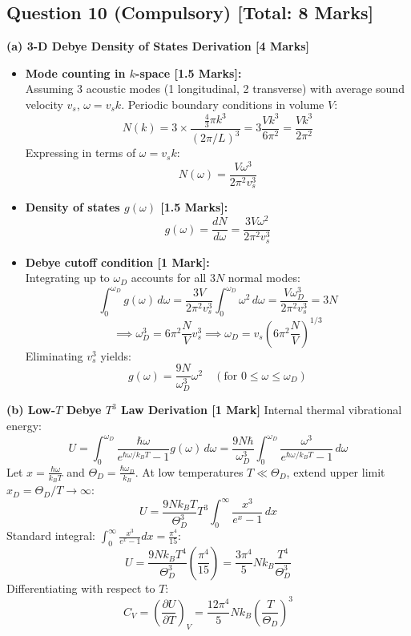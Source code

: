 \documentclass[10pt,a4paper,twocolumn]{article}
\begin{document}
\subsection*{Question 10 (Compulsory) [Total: 8 Marks]}
\textbf{(a) 3-D Debye Density of States Derivation [4 Marks]}
\begin{itemize}
    \item \textbf{Mode counting in $k$-space [1.5 Marks]:}\\
    Assuming 3 acoustic modes (1 longitudinal, 2 transverse) with average sound velocity $v_s$, $\omega = v_s k$. Periodic boundary conditions in volume $V$:
    $$N(k) = 3 \times \frac{\frac{4}{3}\pi k^3}{(2\pi/L)^3} = 3 \frac{V k^3}{6\pi^2} = \frac{V k^3}{2\pi^2}$$
    Expressing in terms of $\omega = v_s k$:
    $$N(\omega) = \frac{V \omega^3}{2\pi^2 v_s^3}$$
    \item \textbf{Density of states $g(\omega)$ [1.5 Marks]:}
    $$g(\omega) = \frac{dN}{d\omega} = \frac{3V \omega^2}{2\pi^2 v_s^3}$$
    \item \textbf{Debye cutoff condition [1 Mark]:}\\
    Integrating up to $\omega_D$ accounts for all $3N$ normal modes:
    $$\int_0^{\omega_D} g(\omega)\,d\omega = \frac{3V}{2\pi^2 v_s^3} \int_0^{\omega_D} \omega^2\,d\omega = \frac{V \omega_D^3}{2\pi^2 v_s^3} = 3N$$
    $$\implies \omega_D^3 = 6\pi^2 \frac{N}{V} v_s^3 \implies \omega_D = v_s \left(6\pi^2 \frac{N}{V}\right)^{1/3}$$
    Eliminating $v_s^3$ yields:
    $$g(\omega) = \frac{9N}{\omega_D^3}\omega^2 \quad (\text{for } 0 \le \omega \le \omega_D)$$
\end{itemize}

\textbf{(b) Low-$T$ Debye $T^3$ Law Derivation [1 Mark]}
Internal thermal vibrational energy:
$$U = \int_0^{\omega_D} \frac{\hbar\omega}{e^{\hbar\omega/k_B T} - 1} g(\omega)\,d\omega = \frac{9N\hbar}{\omega_D^3}\int_0^{\omega_D} \frac{\omega^3}{e^{\hbar\omega/k_B T} - 1}\,d\omega$$
Let $x = \frac{\hbar\omega}{k_B T}$ and $\Theta_D = \frac{\hbar\omega_D}{k_B}$. At low temperatures $T \ll \Theta_D$, extend upper limit $x_D = \Theta_D/T \to \infty$:
$$U = \frac{9N k_B T}{\Theta_D^3} T^3 \int_0^\infty \frac{x^3}{e^x - 1}\,dx$$
Standard integral: $\int_0^\infty \frac{x^3}{e^x - 1}dx = \frac{\pi^4}{15}$:
$$U = \frac{9Nk_B T^4}{\Theta_D^3} \left(\frac{\pi^4}{15}\right) = \frac{3\pi^4}{5} N k_B \frac{T^4}{\Theta_D^3}$$
Differentiating with respect to $T$:
$$C_V = \left(\frac{\partial U}{\partial T}\right)_V = \frac{12\pi^4}{5} N k_B \left(\frac{T}{\Theta_D}\right)^3$$
\end{document}
